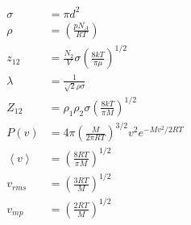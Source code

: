 \begin{align*}
\sigma&=\pi d^2\\
\rho&=\left(\frac{pN_A}{RT}\right)\\
z_{12}&=\frac{N_2}{V}\sigma\left(\frac{8kT}{\pi \mu}\right)^{1/2}\\
\lambda&=\frac{1}{\sqrt{2}\rho\sigma}\\
Z_{12}&=\rho_1\rho_2\sigma\left(\frac{8kT}{\pi M}\right)^{1/2}\\
P(v)&=4\pi\left(\frac{M}{2\pi RT}\right)^{3/2}v^2e^{-Mv^2/2RT}\\
\left<v\right>&=\left(\frac{8RT}{\pi M}\right)^{1/2}\\
v_{rms}&=\left(\frac{3RT}{M}\right)^{1/2}\\
v_{mp}&=\left(\frac{2RT}{M}\right)^{1/2}\\
\end{align*}
